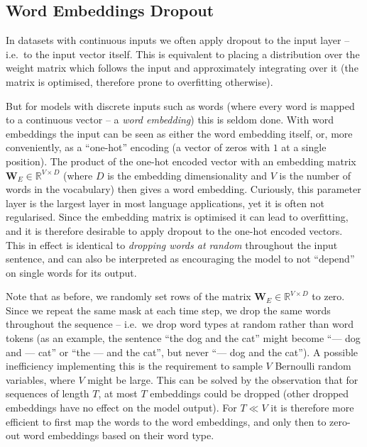 \documentclass{article}
\newcommand{\W}{\mathbf{W}}
\theoremstyle{definition}
\begin{document}
\subsection{Word Embeddings Dropout}
In datasets with continuous inputs we often apply dropout to the input layer -- i.e.\ to the input vector itself. This is equivalent to placing a distribution over the weight matrix which follows the input and approximately integrating over it (the matrix is optimised, therefore prone to overfitting otherwise). 


But for models with discrete inputs such as words (where every word is mapped to a continuous vector -- a \textit{word embedding}) this is seldom done.
With word embeddings the input can be seen as either the word embedding itself, or, more conveniently, as a ``one-hot'' encoding (a vector of zeros with $1$ at a single position). The product of the one-hot encoded vector with an embedding matrix $\W_E \in \mathbb{R}^{V \times D}$ (where $D$ is the embedding dimensionality and $V$ is the number of words in the vocabulary) then gives a word embedding.
Curiously, this parameter layer is the largest layer in most language applications, yet it is often not regularised. 
Since the embedding matrix is optimised it can lead to overfitting, and it is therefore desirable to apply dropout to the one-hot encoded vectors.
This in effect is identical to \textit{dropping words at random} throughout the input sentence, and can also be interpreted as encouraging the model to not ``depend'' on single words for its output.

Note that as before, we randomly set rows of the matrix $\W_E \in \mathbb{R}^{V \times D}$ to zero. Since we repeat the same mask at each time step, we drop the same words throughout the sequence -- i.e.\ we drop word types at random rather than word tokens (as an example, the sentence ``the dog and the cat'' might become ``--- dog and --- cat'' or ``the --- and the cat'', but never ``--- dog and the cat''). A possible inefficiency implementing this is the requirement to sample $V$ Bernoulli random variables, where $V$ might be large. This can be solved by the observation that for sequences of length $T$, at most $T$ embeddings could be dropped (other dropped embeddings have no effect on the model output). For $T \ll V$ it is therefore more efficient to first map the words to the word embeddings, and only then to zero-out word embeddings based on their word type.
\end{document}
